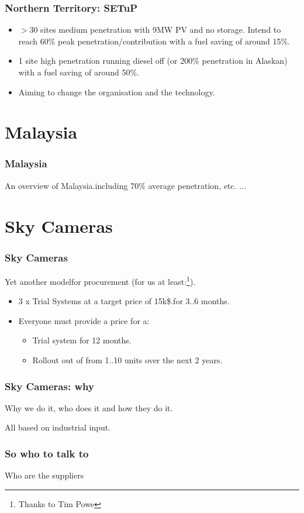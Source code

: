 \documentclass{beamer}
\begin{document}
\begin{frame}\frametitle{Northern Territory: SETuP} 
  \begin{itemize}
  \item $>$30 sites medium penetration with 9MW PV and no storage.
    \pause
    Intend to reach 60\% peak penetration/contribution with a fuel
    saving of around 15\%.
  \item 1 site high penetration running diesel off (or 200\%
    penetration in Alaskan) with a fuel saving of around 50\%.
  \item Aiming to change the organisation and the technology.
  \end{itemize}
\end{frame}

\section{Malaysia}
\begin{frame}\frametitle{Malaysia}
An overview of Malaysia.including 70\% average penetration, etc. ...
\end{frame}

\section{Sky Cameras}

\begin{frame}\frametitle{Sky Cameras}
Yet another modelfor procurement (for us at least:\footnote{Thanks to
  Tim Powe}).
  \begin{itemize}
  \item 3 x Trial Systems at a target price of 15k\$.for 3..6 months.
    \pause
  \item Everyone must provide a price for a:
    \begin{itemize}
    \item Trial system for 12 months.
    \item Rollout out of from 1..10 units over the next 2 years.
    \end{itemize}
  \end{itemize}
\end{frame}

\begin{frame}\frametitle{Sky Cameras: why}
Why we do it, who does it and how they do it.

All based on industrial input.
\end{frame}

\begin{frame}\frametitle{So who to talk to}
Who are the suppliers
\end{frame}
\end{document}
